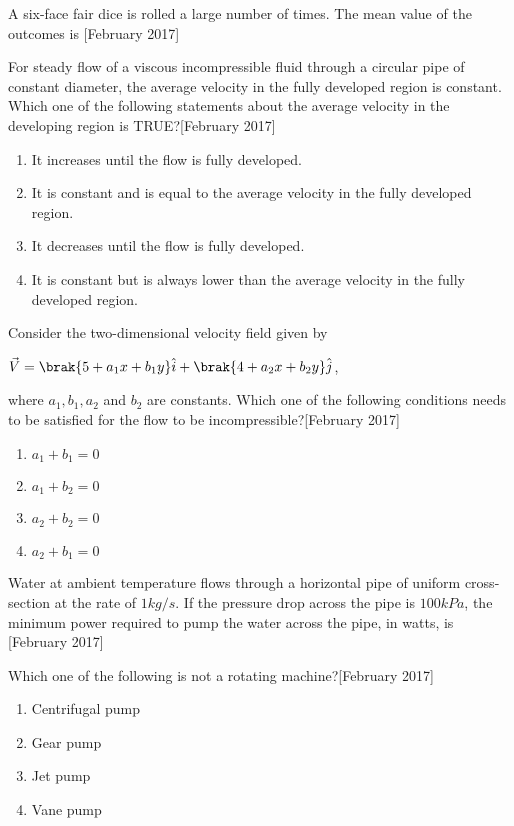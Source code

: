 \item A six-face fair dice is rolled a large number of times. The mean value of the outcomes is \underline{\hspace{2cm}}\hfill[February 2017]
\item For steady flow of a viscous incompressible fluid through a circular pipe of constant diameter, the average velocity in the fully developed region is constant. Which one of the following statements about the average velocity in the developing region is TRUE?\hfill[February 2017]
\begin{enumerate}
    \item It increases until the flow is fully developed.
    \item It is constant and is equal to the average velocity in the fully developed region.
    \item It decreases until the flow is fully developed.
    \item It is constant but is always lower than the average velocity in the fully developed region.
\end{enumerate}

\item Consider the two-dimensional velocity field given by 
\begin{center}
$\vec{V} = \brak{5 + a_1 x + b_1 y} \hat{i} + \brak{4 + a_2 x + b_2 y} \hat{j}$,
\end{center}where $ a_1, b_1, a_2 $ and  $b_2$ are constants. Which one of the following conditions needs to be satisfied for the flow to be incompressible?\hfill[February 2017]
\begin{enumerate}
    \item $a_1 + b_1 = 0$
    \item $a_1 + b_2 = 0$
    \item $a_2 + b_2 = 0$
    \item $a_2 + b_1 = 0$
\end{enumerate}
\item Water  at ambient temperature flows through a horizontal pipe of uniform cross-section at the rate of $1 kg/s$. If the pressure drop across the pipe is $100 kPa$, the minimum power required to pump the water across the pipe, in watts, is\underline{\hspace{2cm}} \hfill[February 2017]
\item Which one of the following is not a rotating machine?\hfill[February 2017]
\begin{enumerate}
    \item Centrifugal pump
    \item Gear pump
    \item Jet pump
    \item Vane pump
\end{enumerate}

